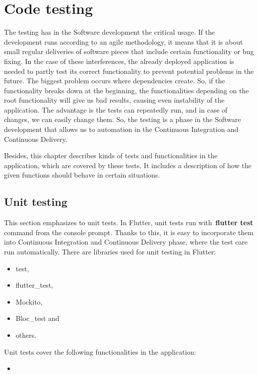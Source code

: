 \section{Code testing}\label{sec:code-testing}
The testing has in the Software development the critical usage.
If the development runs according to an agile methodology, it means that it is about small regular deliveries of software pieces that include certain functionality or bug fixing.
In the case of these interferences, the already deployed application is needed to partly test its correct functionality to prevent potential problems in the future.
The biggest problem occurs where dependencies create.
So, if the functionality breaks down at the beginning, the functionalities depending on the root functionality will give us bad results, causing even instability of the application.
The advantage is the tests can repeatedly run, and in case of changes, we can easily change them.
So, the testing is a phase in the Software development that allows us to automation in the Continuous Integration and Continuous Delivery.

Besides, this chapter describes kinds of tests and functionalities in the application, which are covered by these tests.
It includes a description of how the given functions should behave in certain situations.


\subsection{Unit testing}\label{subsec:unit-testing}
This section emphasizes to unit tests.
In Flutter, unit tests run with~\textbf{flutter test} command from the console prompt.
Thanks to this, it is easy to incorporate them into Continuous Integration and Continuous Delivery phase, where the test care run automatically.
There are libraries used for unit testing in Flutter:
\begin{itemize}
    \item test,
    \item flutter\_test,
    \item Mockito,
    \item Bloc\_test and
    \item others.
\end{itemize}

Unit tests cover the following functionalities in the application:
\begin{itemize}
    \item %
\end{itemize}


